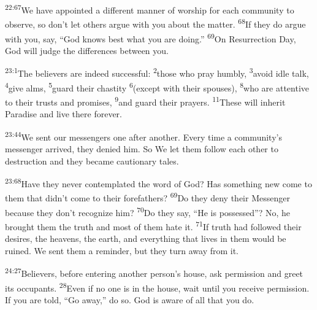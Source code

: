 \documentclass[openany,12pt,english]{book}
\newenvironment{para}{\par\pretolerance=100\tolerance=200\setlength{\emergencystretch}{0.6em}\relax}{\par}
\begin{document}
\begin{para}
    \textsuperscript{22:67}\thinspace{}We have ap\-point\-ed a dif\-fer\-ent man\-ner of wor\-ship for each com\-mu\-ni\-ty to ob\-serve, so don't let others ar\-gue with you a\-bout the mat\-ter.
    \textsuperscript{68}\thinspace{}If they do ar\-gue with you, say, “God knows best what you are do\-ing.”
    \textsuperscript{69}\thinspace{}On Res\-ur\-rec\-tion Day, God will judge the differences be\-tween you.
\end{para}

\bigskip{}

\begin{para}
    \textsuperscript{23:1}\thinspace{}The believers are in\-deed suc\-cess\-ful:
    \textsuperscript{2}\thinspace{}those who pray hum\-bly,
    \textsuperscript{3}\thinspace{}a\-void i\-dle talk,
    \textsuperscript{4}\thinspace{}give alms,
    \textsuperscript{5}\thinspace{}guard their chas\-ti\-ty
    \textsuperscript{6}\thinspace{}(ex\-cept with their spouses),
    \textsuperscript{8}\thinspace{}who are at\-ten\-tive to their trusts and promises,
    \textsuperscript{9}\thinspace{}and guard their prayers.
    \textsuperscript{11}\thinspace{}These will in\-her\-it Par\-a\-dise and live there for\-ev\-er.
\end{para}

\begin{para}
    \textsuperscript{23:44}\thinspace{}We sent our messengers one af\-ter an\-oth\-er. Eve\-ry time a community's mes\-sen\-ger ar\-rived, they de\-nied him. So We let them fol\-low each oth\-er to de\-struc\-tion and they be\-came cau\-tion\-ar\-y ta\-les.
\end{para}

\begin{para}
    \textsuperscript{23:68}\thinspace{}Have they nev\-er con\-tem\-plat\-ed the word of God? Has some\-thing new come to them that did\-n't come to their forefathers?
    \textsuperscript{69}\thinspace{}Do they de\-ny their Mes\-sen\-ger be\-cause they don't rec\-og\-nize him?
    \textsuperscript{70}\thinspace{}Do they say, “He is pos\-sessed”? No, he brought them the truth and most of them hate it.
    \textsuperscript{71}\thinspace{}If truth had followed their desires, the heavens, the earth, and eve\-ry\-thing that lives in them would be ruined. We sent them a reminder, but they turn a\-way from it.
\end{para}

\bigskip{}

\begin{para}
    \textsuperscript{24:27}\thinspace{}Believers, be\-fore entering an\-oth\-er person's house, ask per\-mis\-sion and greet its occupants.
    \textsuperscript{28}\thinspace{}E\-ven if no one is in the house, wait un\-til you re\-ceive per\-mis\-sion. If you are told, “Go a\-way,” do so. God is a\-ware of all that you do.
\end{para}
\end{document}
